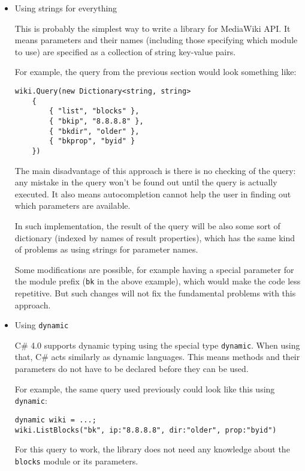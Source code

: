 \begin{itemize}
\item Using strings for everything

This is probably the simplest way to write a library for MediaWiki API.
It means parameters and their names (including those specifying which module to use) are specified
as a collection of string key-value pairs.

For example, the query from the previous section would look something like:

\begin{lstlisting}
wiki.Query(new Dictionary<string, string>
    {
        { "list", "blocks" },
        { "bkip", "8.8.8.8" },
        { "bkdir", "older" },
        { "bkprop", "byid" }
    })
\end{lstlisting}

The main disadvantage of this approach is there is no checking of the query:
any mistake in the query won't be found out until the query is actually executed.
It also means autocompletion cannot help the user in finding out which parameters are available.

In such implementation, the result of the query will be also some sort of dictionary
(indexed by names of result properties), which has the same kind of problems as using strings for parameter names.

Some modifications are possible, for example having a special parameter for the module prefix
(\texttt{bk} in the above example), which would make the code less repetitive.
But such changes will not fix the fundamental problems with this approach.

\item Using \lstinline{dynamic}

C\# 4.0 supports dynamic typing using the special type \lstinline{dynamic}.
When using that, C\# acts similarly as dynamic languages.
This means methods and their parameters do not have to be declared before they can be used.

For example, the same query used previously could look like this using \lstinline{dynamic}:

\begin{lstlisting}
dynamic wiki = ...;
wiki.ListBlocks("bk", ip:"8.8.8.8", dir:"older", prop:"byid")
\end{lstlisting}

For this query to work,
the library does not need any knowledge about the \texttt{blocks} module or its parameters.


\end{itemize}
